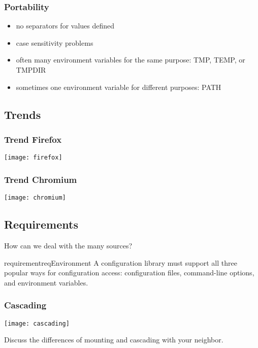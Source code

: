 \begin{frame}
	\frametitle{Portability}
	\begin{itemize}
	\item no separators for values defined
	\item case sensitivity problems
	\item often many environment variables for the same purpose: TMP, TEMP, or TMPDIR
	\item sometimes one environment variable for different purposes: PATH
	\end{itemize}
\end{frame}

\subsection{Trends}

\begin{frame}
	\frametitle{Trend Firefox}
	\texttt{[image: firefox]}
\end{frame}

\begin{frame}
	\frametitle{Trend Chromium}
	\texttt{[image: chromium]}
\end{frame}

\subsection{Requirements}

\begin{frame}
	How can we deal with the many sources?

	\vspace{1cm}

	\begin{restatable}{requirement}{reqEnvironment}
	A configuration library must support all three popular ways for configuration access:
	configuration files, command-line options, and environment variables.
	\end{restatable}
\end{frame}

\begin{frame}
	\frametitle{Cascading}
	\texttt{[image: cascading]}
\end{frame}

\begin{assignment}
	\begin{task}
	Discuss the differences of mounting and cascading with your neighbor.
	\end{task}
\end{assignment}

